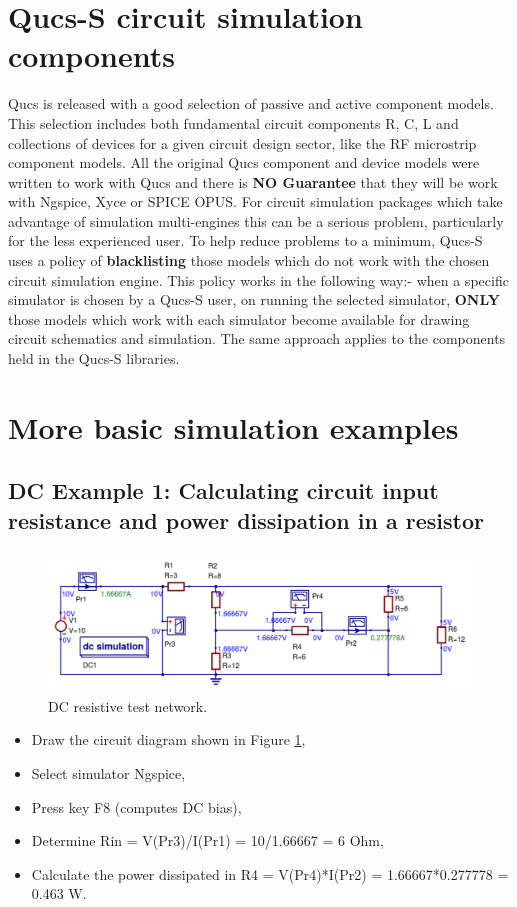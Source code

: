 \documentclass[10pt, a4paper]{report}
\begin{document}
\section{Qucs-S circuit simulation components}
Qucs is released with a good selection of passive and active component models.  This selection includes both fundamental circuit components R, C, L and collections of devices for a given circuit design sector, like the RF microstrip component models.  All the original Qucs component and device models were written
to work with Qucs and there is \textbf{NO Guarantee} that they will be work with Ngspice, Xyce or SPICE OPUS. For circuit simulation packages which take advantage of simulation multi-engines this can be a serious problem, particularly for the less experienced user.  To help reduce problems to a minimum, Qucs-S uses a policy of \textbf{blacklisting} those models which do not work with the chosen circuit simulation engine. This policy works in the following way:- when a specific simulator is chosen by a Qucs-S  user, on running the selected simulator, \textbf{ONLY} those models which work with each simulator become available for drawing circuit schematics and simulation.  The same approach applies to the components held in the Qucs-S libraries.

\section{More basic simulation examples}
\subsection{DC Example 1: Calculating circuit input resistance and power dissipation in a resistor}
 \begin{figure}[h]
	\centering
	\includegraphics[width=15cm]{pics/chap2/DC_EX1.pdf}
	\caption{ DC resistive test network.}
	\label{Fig20}
\end{figure}
\begin{itemize}
	\item {Draw the circuit diagram shown in Figure \ref{Fig20}, }
	\item {Select simulator Ngspice, }
	\item {Press key F8 (computes DC bias), }
	\item {Determine Rin = V(Pr3)/I(Pr1) = 10/1.66667 = 6 Ohm, }
	\item {Calculate the power dissipated in R4 = V(Pr4)*I(Pr2) = 1.66667*0.277778 = 0.463 W. }	
\end{itemize}
\end{document}

